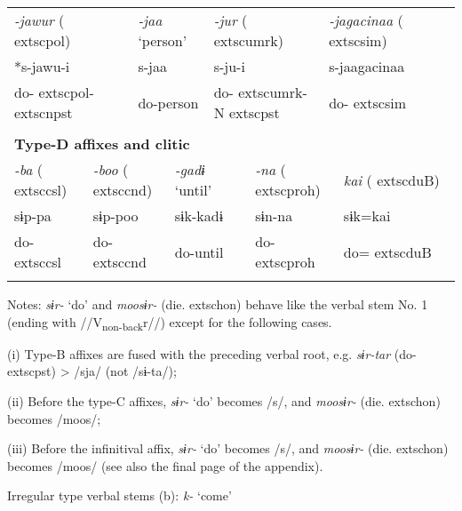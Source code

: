 \begin{tabularx}{\textwidth}{XXXXXXXXXXXXXXXXXXXXX}
\multicolumn{4}{X}{{ \textit{{}-jawur} (	extsc{pol})}} & \multicolumn{4}{X}{{ \textit{{}-jaa} ‘person’}} & \multicolumn{4}{X}{{ \textit{{}-jur} (	extsc{umrk})}} & \multicolumn{9}{X}{{ \textit{{}-jagacinaa} (	extsc{sim})}}\\
\multicolumn{4}{X}{{ *s-jawu-i}} & \multicolumn{4}{X}{{ s-jaa}} & \multicolumn{4}{X}{s-ju-i} & \multicolumn{9}{X}{{ s-jaagacinaa}}\\
\multicolumn{4}{X}{do-	extsc{pol}-	extsc{npst}} & \multicolumn{4}{X}{do-person} & \multicolumn{4}{X}{do-	extsc{umrk}-N	extsc{pst}} & \multicolumn{9}{X}{do-	extsc{sim}}\\
\multicolumn{21}{X}{}\\
\multicolumn{21}{X}{{\bfseries Type-D affixes and clitic}}\\
\multicolumn{2}{X}{{ \textit{{}-ba} (	extsc{csl})}} & \multicolumn{4}{X}{{ \textit{{}-boo} (	extsc{cnd})}} & \multicolumn{3}{X}{{ \textit{{}-gadɨ} ‘until’}} & \multicolumn{4}{X}{{ \textit{{}-na} (	extsc{proh})}} & \multicolumn{8}{X}{{ \textit{kai} (	extsc{du}B)}}\\
\multicolumn{2}{X}{{ sɨp-pa}} & \multicolumn{4}{X}{{ sɨp-poo}} & \multicolumn{3}{X}{{ sɨk-kadɨ}} & \multicolumn{4}{X}{{ sɨn-na}} & \multicolumn{8}{X}{{ sɨk=kai}}\\
\multicolumn{2}{X}{do-	extsc{csl}} & \multicolumn{4}{X}{do-	extsc{cnd}} & \multicolumn{3}{X}{do-until} & \multicolumn{4}{X}{do-	extsc{proh}} & \multicolumn{8}{X}{do=	extsc{du}B}\\
\lspbottomrule
\end{tabularx}
Notes: \textit{sɨr-} ‘do’ and \textit{moosɨr-} (die.	extsc{hon}) behave like the verbal stem No. 1 (ending with //V\textsubscript{non-back}r//) except for the following cases.

(i)  Type-B affixes are fused with the preceding verbal root, e.g. \textit{sɨr-tar} (do-	extsc{pst}) > /sja/ (not /sɨ-ta/);

(ii)  Before the type-C affixes, \textit{sɨr-} ‘do’ becomes /s/, and \textit{moosɨr-} (die.	extsc{hon}) becomes /moos/;

(iii)  Before the infinitival affix, \textit{sɨr-} ‘do’ becomes /s/, and \textit{moosɨr-} (die.	extsc{hon}) becomes /moos/ (see also the final page of the appendix).

Irregular type verbal stems (b): \textit{k-} ‘come’

\tablefirsthead{}

